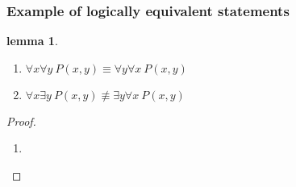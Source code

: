 \documentclass[11pt]{article}
\theoremstyle{definition}
\newtheorem{lemma}{lemma}[subsection]
\begin{document}
\subsubsection{Example of logically equivalent statements}
\begin{lemma}
    \:
    \begin{enumerate}
        \item $\forall x \forall y \: P(x,y) \equiv \forall y \forall x \: P(x,y)$
        \item $\forall x \exists y \: P(x,y) \not\equiv \exists y \forall x \: P(x,y)$
    \end{enumerate}
\end{lemma}

\begin{proof}
    \:
    \begin{enumerate}
        \item 
    \end{enumerate}
\end{proof}
\newpage
\end{document}
